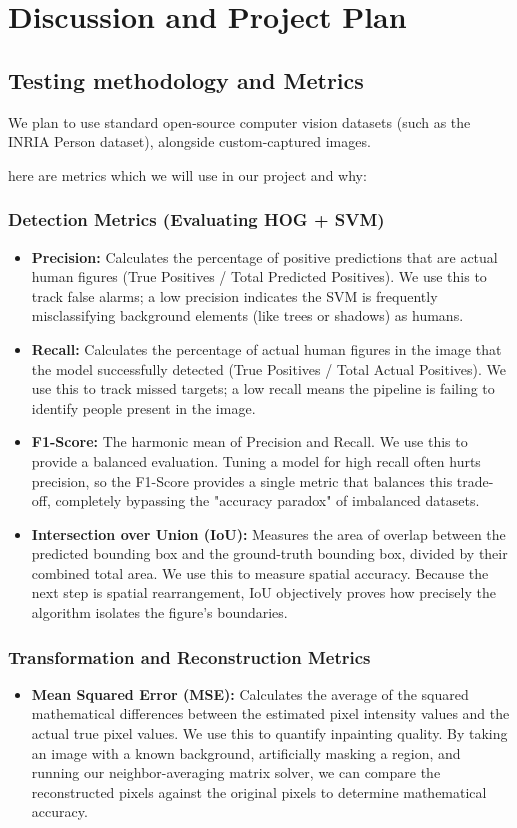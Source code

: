 \documentclass[12pt]{article}
\begin{document}
\section{Discussion and Project Plan}
\subsection*{Testing methodology and Metrics}
We plan to use standard open-source computer vision datasets (such as the INRIA Person dataset), alongside custom-captured images. 

here are metrics which we will use in our project and why:

\subsubsection*{Detection Metrics (Evaluating HOG + SVM)}
\begin{itemize}
    \item \textbf{Precision:} Calculates the percentage of positive predictions that are actual human figures (True Positives / Total Predicted Positives). We use this to track false alarms; a low precision indicates the SVM is frequently misclassifying background elements (like trees or shadows) as humans.
    \item \textbf{Recall:} Calculates the percentage of actual human figures in the image that the model successfully detected (True Positives / Total Actual Positives). We use this to track missed targets; a low recall means the pipeline is failing to identify people present in the image.
    \item \textbf{F1-Score:} The harmonic mean of Precision and Recall. We use this to provide a balanced evaluation. Tuning a model for high recall often hurts precision, so the F1-Score provides a single metric that balances this trade-off, completely bypassing the "accuracy paradox" of imbalanced datasets.
    \item \textbf{Intersection over Union (IoU):} Measures the area of overlap between the predicted bounding box and the ground-truth bounding box, divided by their combined total area. We use this to measure spatial accuracy. Because the next step is spatial rearrangement, IoU objectively proves how precisely the algorithm isolates the figure's boundaries.
\end{itemize}

\subsubsection*{Transformation and Reconstruction Metrics}
\begin{itemize}
    \item \textbf{Mean Squared Error (MSE):} Calculates the average of the squared mathematical differences between the estimated pixel intensity values and the actual true pixel values. We use this to quantify inpainting quality. By taking an image with a known background, artificially masking a region, and running our neighbor-averaging matrix solver, we can compare the reconstructed pixels against the original pixels to determine mathematical accuracy.
\end{itemize}
\end{document}
